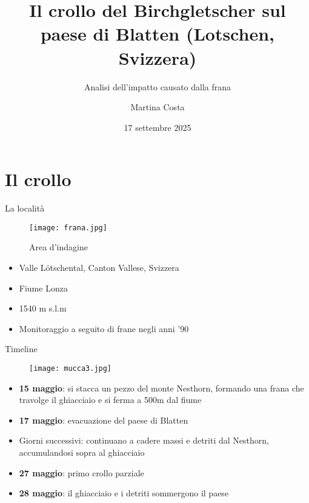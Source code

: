 \documentclass{beamer} %
\title{\textbf{Il crollo del Birchgletscher sul paese di Blatten (Lotschen, Svizzera)}}
\subtitle{Analisi dell'impatto causato dalla frana}
\author{Martina Costa}
\date{17 settembre 2025}
\begin{document}
\maketitle



\section{Il crollo}

\begin{frame}{La località}
\begin{figure}
    \centering
    \texttt{[image: frana.jpg]}
    \vspace{-10pt}
    \caption{Area d'indagine}
    \label{fig:placeholder}
\end{figure}
\vspace{-20pt}
    {\small
    \begin{itemize}
        \item Valle Lötschental, Canton Vallese, Svizzera
        \item Fiume Lonza
        \item 1540 m s.l.m
        \item Monitoraggio a seguito di frane negli anni '90
    \end{itemize}
    }
\end{frame}

\begin{frame}{Timeline}
\begin{multicols}{2}
\begin{figure}
    \centering
    \texttt{[image: mucca3.jpg]}
    \label{fig:placeholder}
\end{figure}
\columnbreak
    {\small
    \begin{itemize}
        \item \textbf{15 maggio}: si stacca un pezzo del monte Nesthorn, formando una frana che travolge il ghiacciaio e si ferma a 500m dal fiume
        \item \textbf{17 maggio}: evacuazione del paese di Blatten
        \item Giorni successivi: continuano a cadere massi e detriti dal Nesthorn, accumulandosi sopra al ghiacciaio
        \item \textbf{27 maggio}: primo crollo parziale
        \item \textbf{28 maggio}: il ghiacciaio e i detriti sommergono il paese
    \end{itemize}
    }
\end{multicols}
\end{frame}
\end{document}

